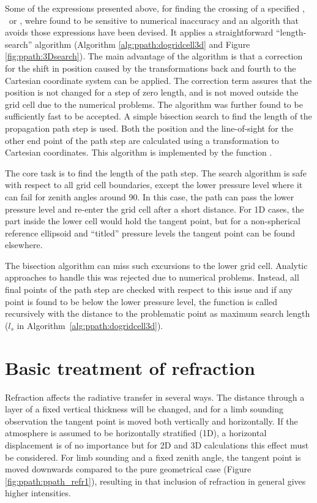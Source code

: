 \noindent
Some of the expressions presented above, for finding the crossing of a
specified \Rds, \Lat\ or \Lon, wehre found to be sensitive to numerical
inaccuracy and an algorith that avoids those expressions have been devised. It
applies a straightforward ``length-search'' algorithm (Algorithm
\ref{alg:ppath:dogridcell3d} and Figure \ref{fig:ppath:3Dsearch}). The main
advantage of the algorithm is that a correction for the shift in position
caused by the transformations back and fourth to the Cartesian coordinate
system can be applied. The correction term assures that the position is not
changed for a step of zero length, and is not moved outside the grid cell due
to the numerical problems. The algorithm was further found to be sufficiently
fast to be accepted. A simple bisection search to find the length of the
propagation path step is used. Both the position and the line-of-sight for the
other end point of the path step are calculated using a transformation to
Cartesian coordinates. This algorithm is implemented by the function
. 

The core task is to find the length of the path step. The search algorithm is
safe with respect to all grid cell boundaries, except the lower pressure level
where it can fail for zenith angles around 90\degree. In this case, the path
can pass the lower pressure level and re-enter the grid cell after a short
distance. For 1D cases, the part inside the lower cell would hold the tangent
point, but for a non-spherical reference ellipsoid and ``titled'' pressure
levels the tangent point can be found elsewhere. 

The bisection algorithm can miss such excursions to the lower grid cell.
Analytic approaches to handle this was rejected due to numerical problems.
Instead, all final points of the path step are checked with respect to this
issue and if any point is found to be below the lower pressure level, the
function is called recursively with the distance to the problematic point as
maximum search length ($l_s$ in Algorithm~\ref{alg:ppath:dogridcell3d}).


\section{Basic treatment of refraction}
\label{sec:ppath:refreuler}

Refraction affects the radiative transfer in several ways. The
distance through a layer of a fixed vertical thickness will be
changed, and for a limb sounding observation the tangent point is
moved both vertically and horizontally. If the atmosphere is assumed
to be horizontally stratified (1D), a horizontal displacement is of no
importance but for 2D and 3D calculations this effect must be
considered. For limb sounding and a fixed zenith angle, the tangent
point is moved downwards compared to the pure geometrical case
(Figure \ref{fig:ppath:ppath_refr1}), resulting in that inclusion of
refraction in general gives higher intensities. 

